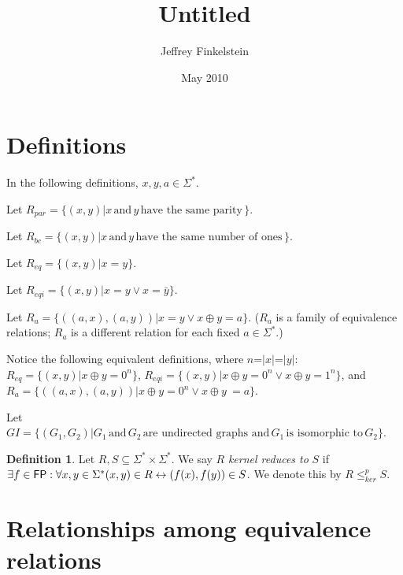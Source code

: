 \documentclass{article}
\author{Jeffrey Finkelstein}
\date{May 2010}
\title{Untitled}
\theoremstyle{definition}
\newtheorem{definition}{Definition}[section]
\newcommand{\plain}[1]{\,\text{#1}\,}
\newcommand{\sigmastar}{\Sigma^{*}}
\newcommand{\kr}{\leq^{p}_{ker}}
\begin{document}
\maketitle

\section{Definitions}

In the following definitions, $x,y,a\in{\Sigma^*}$.

Let $R_{par}=\{(x,y)|x \plain{and} y \plain{have the same parity}\}$.

Let $R_{bc}=\{(x,y)|x \plain{and} y \plain{have the same number of ones}\}$.

Let $R_{eq}=\{(x,y)|x = y\}$.

Let $R_{eqi}=\{(x,y)|x = y \lor x = \bar{y}\}$.

Let $R_{a}=\{((a,x),(a,y))|x = y \lor x \oplus y = a\}$. ($R_{a}$ is a family
of equivalence relations; $R_{a}$ is a different relation for each fixed $a\in\sigmastar$.)

Notice the following equivalent definitions, where $n$=$|x|$=$|y|$:
$R_{eq}=\{(x,y)|x \oplus y = 0^n\}$, $R_{eqi}=\{(x,y)|x \oplus y = 0^n \lor x
\oplus y = 1^n\}$, and $R_{a}=\{((a,x),(a,y))|x \oplus y = 0^n \lor x \oplus
y\ = a\}$.

Let $GI=\{(G_1,G_2)|G_1 \plain{and} G_2 \plain{are undirected graphs and} G_1
\plain{is isomorphic to} G_2\}$.

\begin{definition}Let $R,S\subseteq\sigmastar\times\sigmastar$. We say $R$
  \textit{kernel reduces to} $S$ if $\exists f\in\FP:\forall x,y\in\sigmastar
  (x,y)\in R \leftrightarrow (f(x),f(y))\in S$. We denote this by $R\kr
  S$.\end{definition}

\section{Relationships among equivalence relations}
\end{document}
